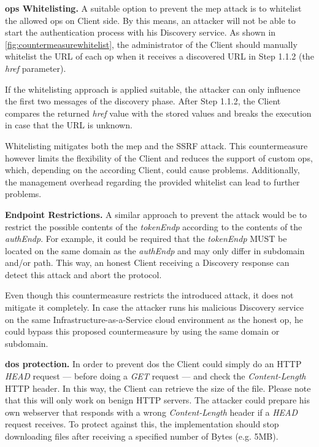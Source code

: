 \documentclass[conference,compsoc]{IEEEtran}
\renewcommand*{\paragraph}[1]{\vspace{2mm}\noindent\textbf{#1.}}
\begin{document}
\paragraph{\glspl{op} Whitelisting}
A suitable option to prevent the \gls{mep} attack is to whitelist the allowed \glspl{op} on Client side.
By this means, an attacker will not be able to start the authentication process with his Discovery service.
As shown in \autoref{fig:countermeasurewhitelist}, the administrator of the Client should manually whitelist the URL of each \gls{op} when it receives a discovered URL in Step 1.1.2 (the \emph{href} parameter). 


If the whitelisting approach is applied suitable, the attacker can only influence the first two messages of the discovery phase.
After Step 1.1.2, the Client compares the returned \emph{href} value with the stored values and breaks the execution in case that the URL is unknown.

Whitelisting mitigates both the \gls{mep} and the SSRF attack. This countermeasure however limits the flexibility of the Client and reduces the support of custom \glspl{op}, which, depending on the according Client, could cause problems. Additionally, the management overhead regarding the provided whitelist can lead to further problems.


\paragraph{Endpoint Restrictions}
A similar approach to prevent the attack would be to restrict the possible contents of the \emph{tokenEndp} according to the contents of the \emph{authEndp}.
For example, it could be required that the \emph{tokenEndp} MUST be located on the same domain as the \emph{authEndp} and may only differ in subdomain and/or path.
This way, an honest Client receiving a Discovery response can detect this attack and abort the protocol.

Even though this countermeasure restricts the introduced attack, it does not mitigate it completely.
In case the attacker runs his malicious Discovery service on the same Infrastructure-as-a-Service cloud environment as the honest \gls{op}, he could bypass this proposed countermeasure by using the same domain or subdomain.

\paragraph{\gls{dos} protection}
In order to prevent \gls{dos} the Client could simply do an HTTP \emph{HEAD} request --- before doing a \emph{GET} request --- and check the \emph{Content-Length} HTTP header.
In this way, the Client can retrieve the size of the file.
Please note that this will only work on benign HTTP servers.
The attacker could prepare his own webserver that responds with a wrong \emph{Content-Length} header if a \emph{HEAD} request receives.
To protect against this, the implementation should stop downloading files after receiving a specified number of Bytes (e.g. 5MB).
\end{document}
